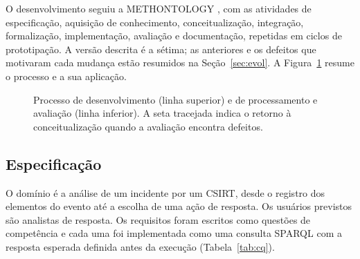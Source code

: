 \documentclass[12pt]{article}
\begin{document}
O desenvolvimento seguiu a METHONTOLOGY \cite{methontology}, com as atividades de especificação, aquisição de conhecimento, conceitualização, integração, formalização, implementação, avaliação e documentação, repetidas em ciclos de prototipação. A versão descrita é a sétima; as anteriores e os defeitos que motivaram cada mudança estão resumidos na Seção~\ref{sec:evol}. A Figura~\ref{fig:metodo} resume o processo e a sua aplicação.

\begin{figure}[ht]
\centering
{}
\caption{Processo de desenvolvimento (linha superior) e de processamento e avaliação (linha inferior). A seta tracejada indica o retorno à conceitualização quando a avaliação encontra defeitos.}
\label{fig:metodo}
\end{figure}

\subsection{Especificação}

O domínio é a análise de um incidente por um CSIRT, desde o registro dos elementos do evento até a escolha de uma ação de resposta. Os usuários previstos são analistas de resposta. Os requisitos foram escritos como questões de competência \cite{gruninger1995} e cada uma foi implementada como uma consulta SPARQL com a resposta esperada definida antes da execução (Tabela~\ref{tab:cq}).
\end{document}
